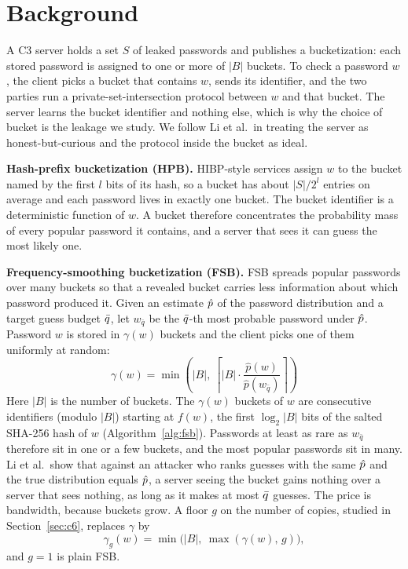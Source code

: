 \section{Background}\label{sec:bg}

A C3 server holds a set $S$ of leaked passwords and publishes a bucketization: each stored password is assigned to one or more of $|B|$ buckets. To check a password $w$, the client picks a bucket that contains $w$, sends its identifier, and the two parties run a private-set-intersection protocol between $w$ and that bucket. The server learns the bucket identifier and nothing else, which is why the choice of bucket is the leakage we study. We follow Li et al.\ in treating the server as honest-but-curious and the protocol inside the bucket as ideal.

\textbf{Hash-prefix bucketization (HPB).} HIBP-style services assign $w$ to the bucket named by the first $l$ bits of its hash, so a bucket has about $|S|/2^l$ entries on average and each password lives in exactly one bucket. The bucket identifier is a deterministic function of $w$. A bucket therefore concentrates the probability mass of every popular password it contains, and a server that sees it can guess the most likely one.

\textbf{Frequency-smoothing bucketization (FSB).} FSB spreads popular passwords over many buckets so that a revealed bucket carries less information about which password produced it. Given an estimate $\hat p$ of the password distribution and a target guess budget $\bar q$, let $w_{\bar q}$ be the $\bar q$-th most probable password under $\hat p$. Password $w$ is stored in $\gamma(w)$ buckets and the client picks one of them uniformly at random:
\begin{equation}\label{eq:gamma}
\gamma(w) = \min\left(|B|,\ \left\lceil |B| \cdot \frac{\hat p(w)}{\hat p(w_{\bar q})} \right\rceil\right)
\end{equation}
Here $|B|$ is the number of buckets. The $\gamma(w)$ buckets of $w$ are consecutive identifiers (modulo $|B|$) starting at $f(w)$, the first $\log_2|B|$ bits of the salted SHA-256 hash of $w$ (Algorithm~\ref{alg:fsb}). Passwords at least as rare as $w_{\bar q}$ therefore sit in one or a few buckets, and the most popular passwords sit in many. Li et al.\ show that against an attacker who ranks guesses with the same $\hat p$ and the true distribution equals $\hat p$, a server seeing the bucket gains nothing over a server that sees nothing, as long as it makes at most $\bar q$ guesses. The price is bandwidth, because buckets grow. A floor $g$ on the number of copies, studied in Section~\ref{sec:c6}, replaces $\gamma$ by
\begin{equation}\label{eq:floor}
\gamma_g(w)=\min\bigl(|B|,\ \max(\gamma(w),\,g)\bigr),
\end{equation}
and $g=1$ is plain FSB.

